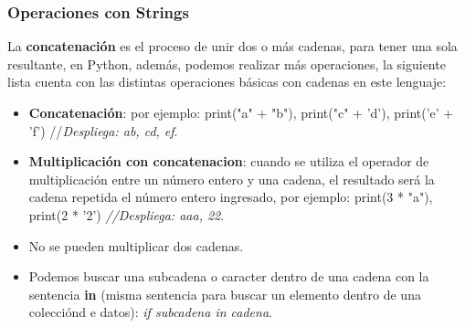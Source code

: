 \subsubsection{Operaciones con Strings}
\hspace{0.55cm}La \textbf{concatenación} es el proceso de unir dos o más cadenas, para tener una sola resultante, en Python, además, podemos realizar más operaciones, la siguiente lista cuenta con las distintas operaciones básicas con cadenas en este lenguaje:
\begin{itemize}
	\item \textbf{Concatenación}: por ejemplo: print("a" + "b"), print("c" + 'd'), print('e' + 'f') //\textit{Despliega: ab, cd, ef}.
	\item \textbf{Multiplicación con concatenacion}: cuando se utiliza el operador de multiplicación entre un número entero y una cadena, el resultado será la cadena repetida el número entero ingresado, por ejemplo: print(3 * "a"), print(2 * '2') \textit{//Despliega: aaa, 22}.
	\item No se pueden multiplicar dos cadenas. \\
	\item Podemos buscar una subcadena o caracter dentro de una cadena con la sentencia \textbf{in} (misma sentencia para buscar un elemento dentro de una colecciónd e datos): \textit{if subcadena in cadena}.
\end{itemize}


